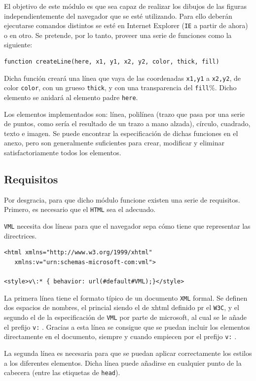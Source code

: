 El objetivo de este módulo es que sea capaz de realizar los dibujos de las figuras independientemente del navegador que se esté utilizando. Para ello deberán ejecutarse comandos distintos se esté en Internet Explorer (\texttt{IE} a partir de ahora) o en otro. Se pretende, por lo tanto, proveer una serie de funciones como la siguiente:

\begin{verbatim}
function createLine(here, x1, y1, x2, y2, color, thick, fill)
\end{verbatim}

Dicha función creará una línea que vaya de las coordenadas \texttt{x1,y1} a \texttt{x2,y2}, de color \texttt{color}, con un grueso \texttt{thick}, y con una transparencia del \texttt{fill}\%. Dicho elemento se anidará al elemento padre \texttt{here}.

Los elementos implementados son: línea, polilínea (trazo que pasa por una serie de puntos, como sería el resultado de un trazo a mano alzada), círculo, cuadrado, texto e imagen. Se puede encontrar la especificación de dichas funciones en el anexo, pero son generalmente suficientes para crear, modificar y eliminar satisfactoriamente todos los elementos.

\subsection{Requisitos}
Por desgracia, para que dicho módulo funcione existen una serie de requisitos. Primero, es necesario que el \texttt{HTML} sea el adecuado.

\texttt{VML} necesita dos líneas para que el navegador sepa cómo tiene que representar las directrices.
\begin{verbatim}
<html xmlns="http://www.w3.org/1999/xhtml" 
   xmlns:v="urn:schemas-microsoft-com:vml">

<style>v\:* { behavior: url(#default#VML);}</style>
\end{verbatim}

La primera línea tiene el formato típico de un documento \texttt{XML} formal. Se definen dos espacios de nombres, el princial siendo el de xhtml definido pr el \texttt{W3C}, y el segundo el de la especificación de \texttt{VML} por parte de microsoft, al cual se le añade el prefijo \texttt{v:} . Gracias a esta línea se consigue que se puedan incluir los elementos directamente en el documento, siempre y cuando empiecen por el prefijo \texttt{v:} .

La segunda línea es necesaria para que se puedan aplicar correctamente los estilos a los diferentes elementos. Dicha línea puede añadirse en cualquier punto de la cabecera (entre las etiquetas de \texttt{head}).

